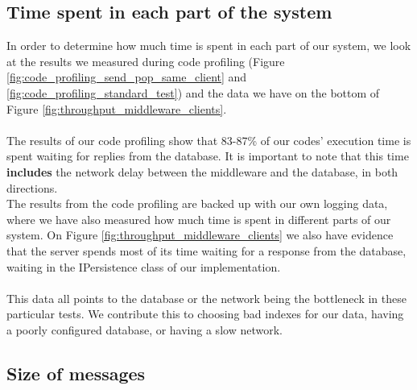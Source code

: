 \documentclass{article}
\begin{document}
\begin{table}
\begin{table}
\begin{table}
        \subsection{Time spent in each part of the system}
            \label{sec:time_spent_in_each_part_of_the_system}
            In order to determine how much time is spent in each part of our system, we look at the results we measured during code profiling (Figure \ref{fig:code_profiling_send_pop_same_client} and \ref{fig:code_profiling_standard_test}) and the data we have on the bottom of Figure \ref{fig:throughput_middleware_clients}.\\
            \\
            The results of our code profiling show that 83-87\% of our codes' execution time is spent waiting for replies from the database. It is important to note that this time \textbf{includes} the network delay between the middleware and the database, in both directions.\\
            The results from the code profiling are backed up with our own logging data, where we have also measured how much time is spent in different parts of our system. On Figure \ref{fig:throughput_middleware_clients} we also have evidence that the server spends most of its time waiting for a response from the database, waiting in the IPersistence class of our implementation.\\
            \\
            This data all points to the database or the network being the bottleneck in these particular tests. We contribute this to choosing bad indexes for our data, having a poorly configured database, or having a slow network.


        \subsection{Size of messages}


\end{table}
\end{table}
\end{table}
\end{document}
